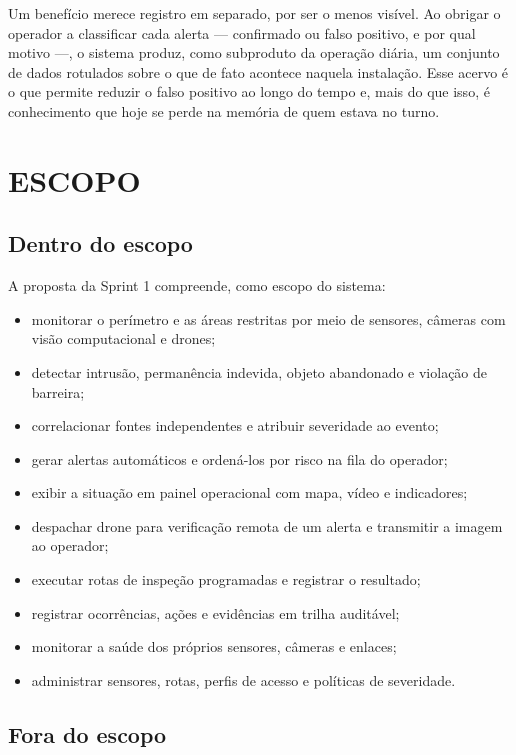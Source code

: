 \documentclass[12pt,a4paper,oneside]{article}
\begin{document}
Um benefício merece registro em separado, por ser o menos visível. Ao obrigar o
operador a classificar cada alerta — confirmado ou falso positivo, e por qual
motivo —, o sistema produz, como subproduto da operação diária, um conjunto de
dados rotulados sobre o que de fato acontece naquela instalação. Esse acervo é
o que permite reduzir o falso positivo ao longo do tempo e, mais do que isso, é
conhecimento que hoje se perde na memória de quem estava no turno.

\section{ESCOPO}
\label{sec:escopo}

\subsection{Dentro do escopo}

A proposta da Sprint 1 compreende, como escopo do sistema:

\begin{itemize}[leftmargin=*,itemsep=2pt,topsep=4pt]
  \item monitorar o perímetro e as áreas restritas por meio de sensores,
        câmeras com visão computacional e drones;
  \item detectar intrusão, permanência indevida, objeto abandonado e violação
        de barreira;
  \item correlacionar fontes independentes e atribuir severidade ao evento;
  \item gerar alertas automáticos e ordená-los por risco na fila do operador;
  \item exibir a situação em painel operacional com mapa, vídeo e indicadores;
  \item despachar drone para verificação remota de um alerta e transmitir a
        imagem ao operador;
  \item executar rotas de inspeção programadas e registrar o resultado;
  \item registrar ocorrências, ações e evidências em trilha auditável;
  \item monitorar a saúde dos próprios sensores, câmeras e enlaces;
  \item administrar sensores, rotas, perfis de acesso e políticas de
        severidade.
\end{itemize}

\subsection{Fora do escopo}
\end{document}
